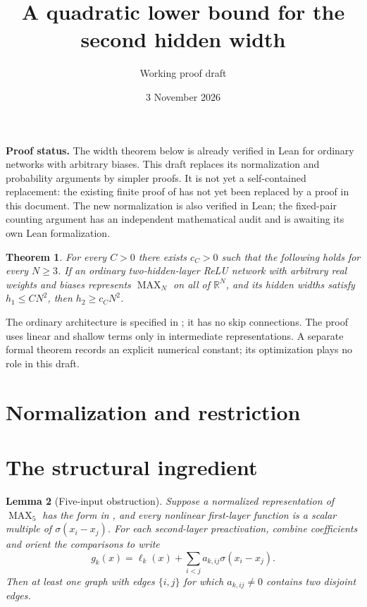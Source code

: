 \documentclass[11pt]{article}
\title{A quadratic lower bound for the second hidden width}
\author{Working proof draft}
\date{3 November 2026}
\newtheorem{theorem}{Theorem}
\newtheorem{lemma}[theorem]{Lemma}
\begin{document}
\maketitle

\noindent\textbf{Proof status.}
The width theorem below is already verified in Lean for ordinary networks
with arbitrary biases. This draft replaces its normalization and probability
arguments by simpler proofs. It is not yet a self-contained replacement:
the existing finite proof of  has not yet
been replaced by a proof in this document. The new normalization is also
verified in Lean; the fixed-pair counting argument has an independent
mathematical audit and is awaiting its own Lean formalization.

\begin{theorem}\label{thm:clean-quadratic-width}
For every $C>0$ there exists $c_C>0$ such that the following holds for
every $N\ge3$. If an ordinary two-hidden-layer ReLU network with arbitrary
real weights and biases represents $\operatorname{MAX}_N$ on all of
$\mathbb R^N$, and its hidden widths satisfy $h_1\le CN^2$, then
$h_2\ge c_C N^2$.
\end{theorem}

The ordinary architecture is specified in
; it has no skip connections.
The proof uses linear and shallow terms only in intermediate representations.
A separate formal theorem records an explicit numerical constant; its
optimization plays no role in this draft.

\section{Normalization and restriction}


\section{The structural ingredient}
\begin{lemma}[Five-input obstruction]\label{lem:five-input-obstruction}
Suppose a normalized representation of $\operatorname{MAX}_5$ has the
form in , and every nonlinear first-layer
function is a scalar multiple of $\sigma(x_i-x_j)$.
For each second-layer preactivation, combine coefficients and orient the
comparisons to write
\[
 g_k(x)=\ell_k(x)+\sum_{i<j}a_{k,ij}\sigma(x_i-x_j).
\]
Then at least one graph with edges $\{i,j\}$ for which $a_{k,ij}\ne0$
contains two disjoint edges.
\end{lemma}
\end{document}
